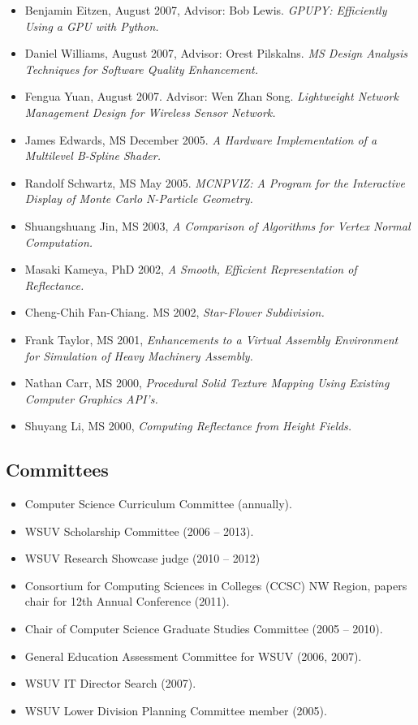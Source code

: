 \documentclass[10pt]{article}
\begin{document}
\begin{itemize}
  \item Benjamin Eitzen,  August 2007, Advisor: Bob Lewis. {\em GPUPY: Efficiently Using a 
    GPU with Python.}
  \item Daniel Williams, August 2007,  Advisor: Orest Pilskalns. {\em MS Design 
    Analysis Techniques for Software Quality Enhancement.}
  \item Fengua Yuan, August 2007. Advisor: Wen Zhan Song. {\em Lightweight Network Management 
     Design for Wireless Sensor Network.}
\item James Edwards, MS December 2005. {\em A Hardware
    Implementation of a Multilevel B-Spline Shader.}
\item Randolf Schwartz, MS May 2005. {\em MCNPVIZ: A Program for the
    Interactive Display of Monte Carlo N-Particle Geometry.}
\item Shuangshuang Jin, MS 2003, {\em A Comparison of
    Algorithms for Vertex Normal Computation.}
\item Masaki Kameya, PhD 2002, {\em A Smooth,
   Efficient Representation of Reflectance.}
\item Cheng-Chih Fan-Chiang. MS 2002, {\em Star-Flower
   Subdivision.}
\item Frank Taylor, MS 2001, {\em Enhancements to a 
   Virtual Assembly Environment for Simulation of Heavy
   Machinery Assembly.}   
\item Nathan Carr, MS 2000, {\em Procedural Solid
   Texture Mapping Using Existing Computer Graphics API's.}
\item Shuyang Li, MS 2000, {\em Computing Reflectance
   from Height Fields.}
\end{itemize}

\subsection*{Committees}

\begin{itemize}
\item Computer Science Curriculum Committee (annually).
\item WSUV Scholarship Committee (2006 -- 2013).
\item WSUV Research Showcase judge (2010 -- 2012)
\item Consortium for Computing Sciences in Colleges (CCSC) NW Region,
   papers chair for 12th Annual Conference (2011).
\item Chair of Computer Science Graduate Studies Committee (2005 -- 2010).
\item General Education Assessment Committee for WSUV (2006, 2007).
\item WSUV IT Director Search (2007).
\item WSUV Lower Division Planning Committee member (2005).
\end{itemize}
\end{document}
